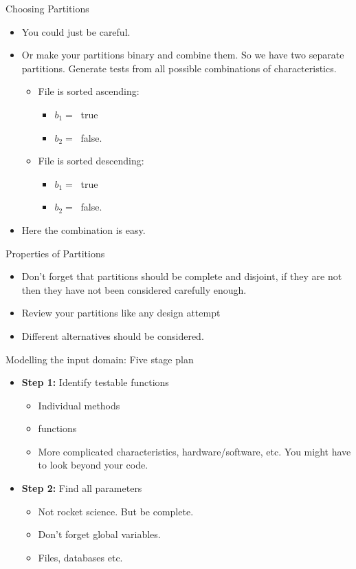 \documentclass{beamer}
\begin{document}
\begin{frame}{Choosing Partitions}

  \begin{itemize}
  \item You could just be careful.
  \item Or make your partitions binary and combine them. So we have two
    separate partitions. Generate tests from all possible combinations of
    characteristics. 
    \begin{itemize}
    \item File is sorted ascending:
      \begin{itemize}
      \item $b_1 = \ $ true
      \item $b_2 = \ $ false.
      \end{itemize}
    \item File is sorted descending:
      \begin{itemize}
      \item $b_1 = \ $ true
      \item $b_2 = \ $ false.
      \end{itemize}
    \end{itemize}
    \item Here the combination  is easy. 
  \end{itemize} 
\end{frame}
\begin{frame}{Properties of Partitions}
  \begin{itemize}
  \item Don't forget that partitions should be complete and disjoint,
    if they are not then they have not been considered carefully
    enough.
    \item Review your partitions like any design attempt
    \item Different alternatives should be considered.
  \end{itemize}
\end{frame}
\begin{frame}{Modelling the input domain: Five stage plan}

  \begin{itemize}
  \item {\bf Step 1:} Identify testable functions
    \begin{itemize}
    \item Individual methods
    \item functions
    \item More complicated characteristics, hardware/software,
      etc. You might have to look beyond your code.
    \end{itemize}
  \item {\bf Step 2:} Find all parameters
    \begin{itemize}
    \item Not rocket science. But be complete.
    \item Don't forget global variables.
    \item Files, databases etc.
    \end{itemize}
  \end{itemize}
  \end{frame}
\end{document}
